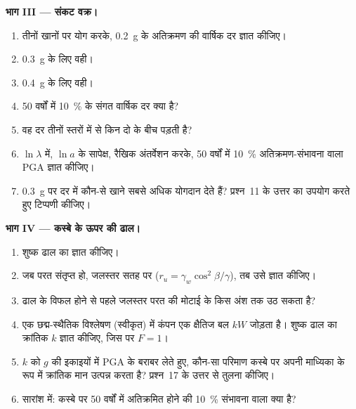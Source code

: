 \begin{problem}[{सप्ताहांत समस्या --- एक भ्रंश और एक ढाल के बीच एक कस्बा}]
\noindent\textbf{भाग III --- संकट वक्र।}
\begin{enumerate}[resume]
  \item तीनों खानों पर योग करके, \qty{0.2}{g} के अतिक्रमण की वार्षिक दर ज्ञात कीजिए।
  \item \qty{0.3}{g} के लिए वही।
  \item \qty{0.4}{g} के लिए वही।
  \item 50 वर्षों में \qty{10}{\percent} के संगत वार्षिक दर क्या है?
  \item वह दर तीनों स्तरों में से किन दो के बीच पड़ती है?
  \item $\ln\lambda$ में, $\ln a$ के सापेक्ष, रैखिक अंतर्वेशन करके, 50 वर्षों में
        \qty{10}{\percent} अतिक्रमण-संभावना वाला PGA ज्ञात कीजिए।
  \item \qty{0.3}{g} पर दर में कौन-से खाने सबसे अधिक योगदान देते हैं? प्रश्न~11 के उत्तर का उपयोग करते हुए
        टिप्पणी कीजिए।
\end{enumerate}

\noindent\textbf{भाग IV --- कस्बे के ऊपर की ढाल।}
\begin{enumerate}[resume]
  \item शुष्क ढाल का  ज्ञात कीजिए।
  \item जब परत संतृप्त हो, जलस्तर सतह पर ($r_u =
        \gamma_w\cos^2\beta/\gamma$), तब उसे ज्ञात कीजिए।
  \item ढाल के विफल होने से पहले जलस्तर परत की मोटाई के किस अंश तक उठ सकता है?
  \item एक छद्म-स्थैतिक विश्लेषण (स्वीकृत) में कंपन एक क्षैतिज बल $kW$ जोड़ता है। शुष्क ढाल का
        क्रांतिक $k$ ज्ञात कीजिए, जिस पर $F = 1$।
  \item $k$ को $g$ की इकाइयों में PGA के बराबर लेते हुए, कौन-सा परिमाण कस्बे पर अपनी माध्यिका के रूप में
        क्रांतिक मान उत्पन्न करता है? प्रश्न~17 के उत्तर से तुलना कीजिए।
  \item सारांश में: कस्बे पर 50 वर्षों में अतिक्रमित होने की \qty{10}{\percent} संभावना वाला
         क्या है?
\end{enumerate}
\end{problem}
